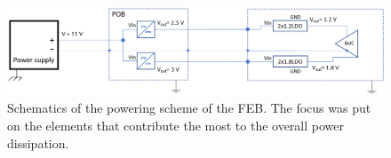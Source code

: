  \begin{figure}[h!]
\centering
\includegraphics[width=1\columnwidth]{Chapter6/DCS/images/powering_diss_feb.png}
\caption{Schematics of the powering scheme of the \gls{FEB}. The focus was put on the elements that contribute the most to the overall power dissipation.}
\label{fig_power_scheme}
\end{figure}
\begin{table}[!h]
\centering
\caption{Power dissipation of the powering system in the function of the CSA registers values. Once the ASICs are configured, the digital line current remains constant. The SMX ASIC is denoted as Integrated Circuit (IC).}
\label{tab:distribution}
\end{table}

